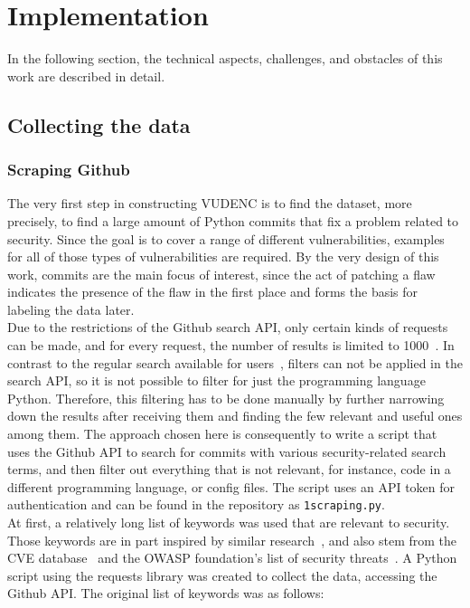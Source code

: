 \documentclass[
a4paper,
pagesize,
pdftex,
12pt,
twoside, %
BCOR=5mm, %
ngerman,
fleqn,
final,
]{scrartcl}
\begin{document}
	
	
	\newpage
	\section{Implementation}\label{Implementation}
	In the following section, the technical aspects, challenges, and obstacles of this work are described in detail.
	
	\subsection{Collecting the data}
	\subsubsection{Scraping Github}
	The very first step in constructing VUDENC is to find the dataset, more precisely, to find a large amount of Python commits that fix a problem related to security. Since the goal is to cover a range of different vulnerabilities, examples for all of those types of vulnerabilities are required. By the very design of this work, commits are the main focus of interest, since the act of patching a flaw indicates the presence of the flaw in the first place and forms the basis for labeling the data later.\\	
	Due to the restrictions of the Github search API, only certain kinds of requests can be made, and for every request, the number of results is limited to 1000~\cite{Github.com.2}. In contrast to the regular search available for users~\cite{Github.com.2019}, filters can not be applied in the search API, so it is not possible to filter for just the programming language Python. Therefore, this filtering has to be done manually by further narrowing down the results after receiving them and finding the few relevant and useful ones among them.
	The approach chosen here is consequently to write a script that uses the Github API to search for commits with various security-related search terms, and then filter out everything that is not relevant, for instance, code in a different programming language, or config files. The script uses an API token for authentication and can be found in the repository as \texttt{1scraping.py}.\\
	At first, a relatively long list of keywords was used that are relevant to security. Those keywords are in part inspired by similar research~\cite{Zhou.2017}, and also stem from the CVE database~\cite{CVE} and the OWASP foundation's list of security threats~\cite{OWASPFoundation.}. A Python script using the requests library was created to collect the data, accessing the Github API. The original list of keywords was as follows:
	\lstset{basicstyle=\small}
	
\end{document}
